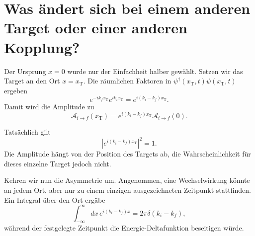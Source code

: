 \section{Was ändert sich bei einem anderen Target oder einer anderen Kopplung?}

Der Ursprung \(x=0\) wurde nur der Einfachheit halber gewählt. Setzen wir das Target an den Ort \(x=x_{\mathrm T}\). Die räumlichen Faktoren in \(\psi^\dagger(x_{\mathrm T},t)\psi(x_{\mathrm T},t)\) ergeben
\begin{equation}
e^{-ik_f x_{\mathrm T}}e^{ik_i x_{\mathrm T}}
=e^{i(k_i-k_f)x_{\mathrm T}}.
\end{equation}
Damit wird die Amplitude zu
\begin{equation}
\mathcal A_{i\to f}(x_{\mathrm T})
=e^{i(k_i-k_f)x_{\mathrm T}}
\mathcal A_{i\to f}(0).
\end{equation}

\begin{classroomqa}
\end{classroomqa}

Tatsächlich gilt
\begin{equation}
\left|e^{i(k_i-k_f)x_{\mathrm T}}\right|^2=1.
\end{equation}
Die Amplitude hängt von der Position des Targets ab, die Wahrscheinlichkeit für dieses einzelne Target jedoch nicht.

Kehren wir nun die Asymmetrie um. Angenommen, eine Wechselwirkung könnte an jedem Ort, aber nur zu einem einzigen ausgezeichneten Zeitpunkt stattfinden. Ein Integral über den Ort ergäbe
\begin{equation}
\int_{-\infty}^{\infty}dx\,
e^{i(k_i-k_f)x}
=2\pi\delta(k_i-k_f),
\end{equation}
während der festgelegte Zeitpunkt die Energie-Deltafunktion beseitigen würde.

\begin{classroomqa}
\end{classroomqa}

